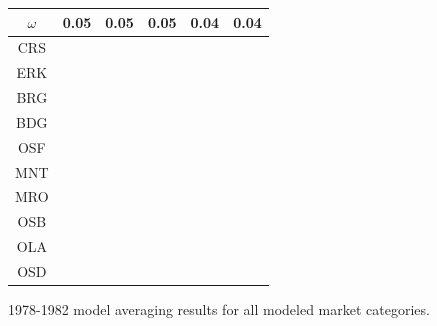 \documentclass[12pt]{article}
\begin{document}
\begin{landscape}
\begin{figure}
\begin{minipage}[c]{0.3\textwidth}
\begin{tabular}{|c|c|c|c|c|c|}
         $\omega$&0.05&0.05&0.05&0.04&0.04 \\ \hline
        CRS&\cellcolor[HTML]{E41A1C}&\cellcolor[HTML]{E41A1C}&\cellcolor[HTML]{E41A1C}&\cellcolor[HTML]{E41A1C}&\cellcolor[HTML]{E41A1C} \\ \hline
        ERK&\cellcolor[HTML]{E41A1C}&\cellcolor[HTML]{E41A1C}&\cellcolor[HTML]{E41A1C}&\cellcolor[HTML]{377EB8}&\cellcolor[HTML]{377EB8} \\ \hline
        BRG&\cellcolor[HTML]{377EB8}&\cellcolor[HTML]{377EB8}&\cellcolor[HTML]{377EB8}&\cellcolor[HTML]{4DAF4A}&\cellcolor[HTML]{4DAF4A} \\ \hline
        BDG&\cellcolor[HTML]{377EB8}&\cellcolor[HTML]{377EB8}&\cellcolor[HTML]{377EB8}&\cellcolor[HTML]{4DAF4A}&\cellcolor[HTML]{4DAF4A} \\ \hline
        OSF&\cellcolor[HTML]{377EB8}&\cellcolor[HTML]{377EB8}&\cellcolor[HTML]{377EB8}&\cellcolor[HTML]{4DAF4A}&\cellcolor[HTML]{4DAF4A} \\ \hline
        MNT&\cellcolor[HTML]{4DAF4A}&\cellcolor[HTML]{4DAF4A}&\cellcolor[HTML]{4DAF4A}&\cellcolor[HTML]{984EA3}&\cellcolor[HTML]{984EA3} \\ \hline
        MRO&\cellcolor[HTML]{984EA3}&\cellcolor[HTML]{4DAF4A}&\cellcolor[HTML]{4DAF4A}&\cellcolor[HTML]{FF7F00}&\cellcolor[HTML]{984EA3} \\ \hline
        OSB&\cellcolor[HTML]{984EA3}&\cellcolor[HTML]{984EA3}&\cellcolor[HTML]{984EA3}&\cellcolor[HTML]{FFFF33}&\cellcolor[HTML]{984EA3} \\ \hline
        OLA&\cellcolor[HTML]{FF7F00}&\cellcolor[HTML]{984EA3}&\cellcolor[HTML]{FF7F00}&\cellcolor[HTML]{FFFF33}&\cellcolor[HTML]{FF7F00} \\ \hline
        OSD&\cellcolor[HTML]{FF7F00}&\cellcolor[HTML]{FF7F00}&\cellcolor[HTML]{FF7F00}&\cellcolor[HTML]{FFFF33}&\cellcolor[HTML]{FFFF33} \\ \hline
\end{tabular}
\end{minipage}
\caption{1978-1982 model averaging results for all modeled market categories.} 
\label{colorTabApp78}
\end{figure}
\end{landscape}

%
\clearpage
%
\end{document}
